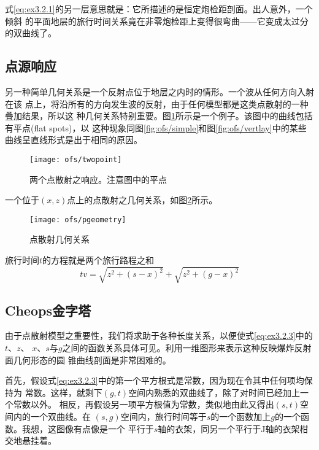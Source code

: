 式\ref{eq:ex3.2.1}的另一层意思就是：它所描述的是恒定炮检距剖面。出人意外，一个倾斜
的平面地层的旅行时间关系竟在非零炮检距上变得很弯曲——它变成太过分的双曲线了。

\subsection{点源响应}
\label{sec:3.2.3}

另一种简单几何关系是一个反射点位于地层之内时的情形。一个波从任何方向入射在该
点上，将沿所有的方向发生波的反射，由于任何模型都是这类点散射的一种叠加结果，所以这
种几何关系特别重要。图\ref{fig:ofs/twopoint}所示是一个例子。该图中的曲线包括有平点(flat spots)，以
这种现象同图\ref{fig:ofs/simple}和图\ref{fig:ofs/vertlay}中的某些曲线呈直线形式是出于相同的原因。
\begin{figure}[H]
\centering
\texttt{[image: ofs/twopoint]}
\caption[twopoint]{两个点散射之响应。注意图中的平点}
\label{fig:ofs/twopoint}
\end{figure}
一个位于$(x,z)$点上的点散射之几何关系，如图\ref{fig:ofs/pgeometry}所示。
\begin{figure}[H]
\centering
\texttt{[image: ofs/pgeometry]}
\caption[pgeometry]{点散射几何关系}
\label{fig:ofs/pgeometry}
\end{figure}
旅行时间$t$的方程就是两个旅行路程之和
\begin{equation}
tv=\sqrt{z^2+(s-x)^2}+\sqrt{z^2+(g-x)^2}
\label{eq:ex3.2.3}
\end{equation}

\subsection{Cheops金字塔}
\label{sec:3.2.4}

由于点散射模型之重要性，我们将求助于各种长度关系，以便使式\ref{eq:ex3.2.3}中的$t$、$z$、
$x$、$s$与$g$之间的函数关系具体可见。利用一维图形来表示这种反映爆炸反射面几何形态的圆
锥曲线剖面是非常困难的。

首先，假设式\ref{eq:ex3.2.3}中的第一个平方根式是常数，因为现在令其中任何项均保持为
常数。这样，就剩下$(g,t)$空间内熟悉的双曲线了，除了对时间已经加上一个常数以外。
相反，再假设另一项平方根值为常数，类似地由此又得出$(s,t)$空间内的一个双曲线。在
$(s,g)$空间内，旅行时间等于$s$的一个函数加上$g$的一个函数。我想，这图像有点像是一个
平行于$s$轴的衣架，同另一个平行于J轴的衣架柑交地悬挂着。


